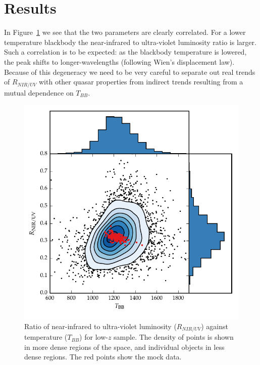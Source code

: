 \section{Results}


In Figure~\ref{fig:ratio_tbb_density} we see that the two parameters are clearly correlated. 
For a lower temperature blackbody the near-infrared to ultra-violet luminosity ratio is larger. 
Such a correlation is to be expected: as the blackbody temperature is lowered, the peak shifts to longer-wavelengths (following Wien's displacement law). 
Because of this degeneracy we need to be very careful to separate out real trends of $R_{NIR/UV}$ with other quasar properties from indirect trends resulting from a mutual dependence on $T_{BB}$.  

\begin{figure}
  \centering
  \includegraphics[width=\textwidth]{figures/chapter05/ratio_tbb_density.pdf}
  \caption[{Ratio of near-infrared to ultra-violet luminosity ($R_{NIR/UV}$) against temperature ($T_{BB}$) for low-$z$ sample.}]{Ratio of near-infrared to ultra-violet luminosity ($R_{NIR/UV}$) against temperature ($T_{BB}$) for low-$z$ sample. The density of points is shown in more dense regions of the space, and individual objects in less dense regions. The red points show the mock data.}
  \label{fig:ratio_tbb_density}
\end{figure}

